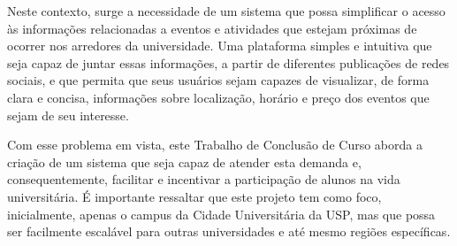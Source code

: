 Neste contexto, surge a necessidade de um sistema que possa simplificar o
acesso às informações relacionadas a eventos e atividades que estejam próximas
de ocorrer nos arredores da universidade. Uma plataforma simples e intuitiva
que seja capaz de juntar essas informações, a partir de diferentes publicações
de redes sociais, e que permita que seus usuários sejam capazes de visualizar,
de forma clara e concisa, informações sobre localização, horário e preço dos
eventos que sejam de seu interesse.

Com esse problema em vista, este Trabalho de Conclusão de Curso aborda a
criação de um sistema que seja capaz de atender esta demanda e,
consequentemente, facilitar e incentivar a participação de alunos na vida
universitária. É importante ressaltar que este projeto tem como foco,
inicialmente, apenas o campus da Cidade Universitária da USP, mas que possa ser
facilmente escalável para outras universidades e até mesmo regiões específicas.